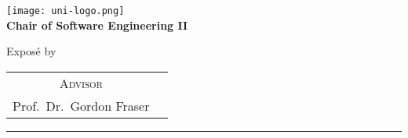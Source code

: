 \begin{titlepage}
    \centering
    \begin{onehalfspace}
    

        	\texttt{[image: uni-logo.png]}\\
        	\vspace{1.0cm}
        	\large {\bfseries Chair of Software Engineering II} \\


        	\vspace{2.5cm}


            \begin{doublespace}
            	{\textsf{\Huge{\thetitle}}}
            \end{doublespace}


        	\vspace{2cm}


            \Large{Exposé by}\\


        	\vspace{1cm}


        	{\bfseries \large{\theauthor}}


        	\vfill


        	{\large
        		\begin{tabular}[l]{cc}
        			\textsc{Advisor}\\
        			Prof.~Dr.~Gordon Fraser
        		\end{tabular}
        	}


        	\vspace{1.5cm}


        	\parbox{\linewidth}{\hrule\strut}


            \vfill


	    {\thedate}

    	
    \end{onehalfspace}
\end{titlepage}
